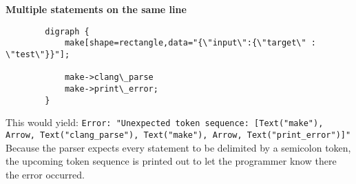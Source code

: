 \documentclass{article}
\begin{document}
		\textbf{Multiple statements on the same line}
		\begin{verbatim}
		digraph {
		    make[shape=rectangle,data="{\"input\":{\"target\" : \"test\"}}"];
    
		    make->clang\_parse
		    make->print\_error;
		}
    	\end{verbatim}

		This would yield: \texttt{Error: "Unexpected token sequence: [Text("make"), Arrow, Text("clang\_parse"), Text("make"), Arrow, Text("print\_error")]"}
		Because the parser expects every statement to be delimited by a semicolon token, the upcoming token sequence is printed out to let the programmer know there the error occurred.
\end{document}
